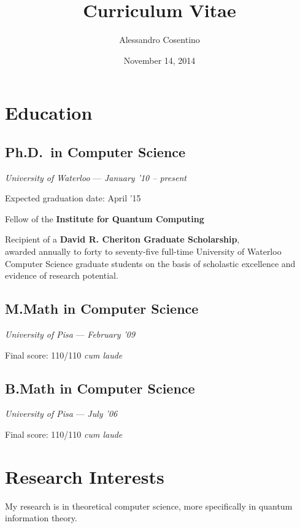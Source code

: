 \documentclass[]{article}
\title{Curriculum Vitae}
\author{Alessandro Cosentino}
\date{November 14, 2014}
\begin{document}
\maketitle
\thispagestyle{empty}

\section{Education}\label{education}

\subsection{Ph.D.~in Computer Science}\label{ph.d.in-computer-science}

\emph{University of Waterloo} --- \emph{January '10 -- present}

Expected graduation date: April '15

Fellow of the \textbf{Institute for Quantum Computing}

Recipient of a \textbf{David R. Cheriton Graduate Scholarship},\\awarded
annually to forty to seventy-five full-time University of Waterloo
Computer Science graduate students on the basis of scholastic excellence
and evidence of research potential.

\subsection{M.Math in Computer
Science}\label{m.math-in-computer-science}

\emph{University of Pisa} --- \emph{February '09}

Final score: 110/110 \emph{cum laude}

\subsection{B.Math in Computer
Science}\label{b.math-in-computer-science}

\emph{University of Pisa} --- \emph{July '06}

Final score: 110/110 \emph{cum laude}

\section{Research Interests}

My research is in theoretical computer science, more specifically in quantum 
information theory.
\end{document}
